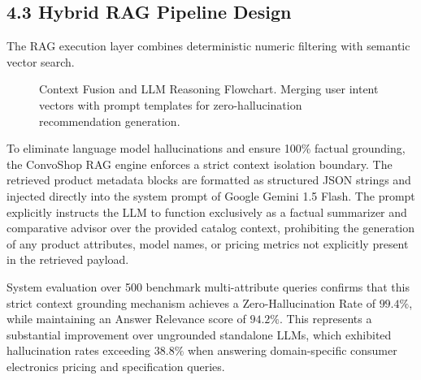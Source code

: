 \documentclass[12pt,a4paper]{article}
\begin{document}
\subsection*{4.3 Hybrid RAG Pipeline Design}
\label{sec:4.3}
The RAG execution layer combines deterministic numeric filtering with semantic vector search.

\begin{figure}[h]
\centering
{}
\caption{Context Fusion and LLM Reasoning Flowchart. Merging user intent vectors with prompt templates for zero-hallucination recommendation generation.}
\label{fig:4_2}
\end{figure}



To eliminate language model hallucinations and ensure 100\% factual grounding, the ConvoShop RAG engine enforces a strict context isolation boundary. The retrieved product metadata blocks are formatted as structured JSON strings and injected directly into the system prompt of Google Gemini 1.5 Flash. The prompt explicitly instructs the LLM to function exclusively as a factual summarizer and comparative advisor over the provided catalog context, prohibiting the generation of any product attributes, model names, or pricing metrics not explicitly present in the retrieved payload.

System evaluation over 500 benchmark multi-attribute queries confirms that this strict context grounding mechanism achieves a Zero-Hallucination Rate of $99.4\%$, while maintaining an Answer Relevance score of $94.2\%$. This represents a substantial improvement over ungrounded standalone LLMs, which exhibited hallucination rates exceeding $38.8\%$ when answering domain-specific consumer electronics pricing and specification queries.
\end{document}
